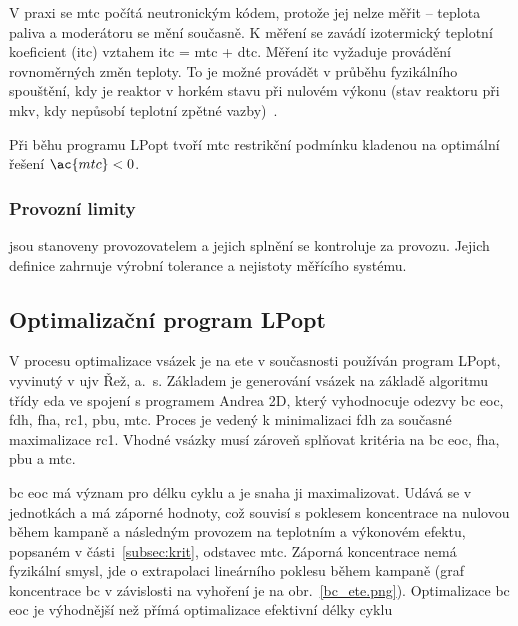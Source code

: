 V praxi se \ac{mtc} počítá neutronickým kódem, protože jej nelze 
měřit -- teplota paliva a moderátoru se mění současně. 
K měření se zavádí izotermický teplotní koeficient 
(\ac{itc}) vztahem \ac{itc} = \ac{mtc} + \ac{dtc}. Měření \ac{itc} vyžaduje provádění rovnoměrných změn teploty. To je možné provádět v průběhu fyzikálního 
spouštění, 
kdy je reaktor v horkém stavu při nulovém výkonu (stav reaktoru při \ac{mkv}, kdy nepůsobí teplotní zpětné vazby)~\cite{sklenka}. 

Při běhu programu LPopt tvoří \ac{mtc} restrikční podmínku kladenou na optimální řešení $\ac{mtc}<0$.


\subsubsection*{Provozní limity} jsou stanoveny provozovatelem a jejich splnění se kontroluje za provozu. Jejich definice zahrnuje výrobní tolerance 
a nejistoty měřícího systému. 

\subsection{Optimalizační program LPopt}
V procesu optimalizace vsázek je na \ac{ete} v současnosti používán program LPopt, vyvinutý v \ac{ujv} Řež, a.~s. Základem je generování 
vsázek na základě algoritmu třídy \ac{eda} \cite{roubalik} ve spojení s programem Andrea 2D, který vyhodnocuje odezvy \ac{bc} \ac{eoc}, \ac{fdh}, \ac{fha}, 
\ac{rc1}, \ac{pbu}, \ac{mtc}. Proces je vedený k minimalizaci \ac{fdh} za současné maximalizace \ac{rc1}. Vhodné vsázky musí zároveň splňovat 
kritéria na \ac{bc} \ac{eoc}, \ac{fha}, \ac{pbu} a \ac{mtc}. 

\ac{bc} \ac{eoc} má význam pro délku cyklu a je snaha ji maximalizovat. Udává se v jednotkách  a má záporné hodnoty, což souvisí 
s poklesem koncentrace na nulovou během kampaně a následným provozem na teplotním a výkonovém efektu, popsaném v části~\ref{subsec:krit}, odstavec 
\ac{mtc}. Záporná koncentrace nemá fyzikální smysl, jde o extrapolaci lineárního poklesu během kampaně (graf koncentrace \ac{bc} v závislosti na vyhoření 
je na obr.~\ref{bc_ete.png}). Optimalizace \ac{bc} \ac{eoc} je výhodnější než přímá optimalizace efektivní délky 
cyklu

